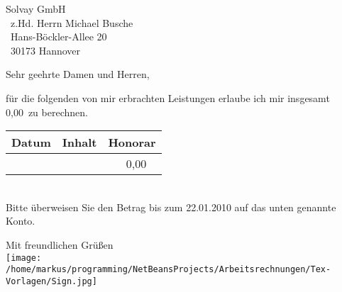 \documentclass[a4paper,12pt]{scrlttr2}
\begin{document}
\begin{letter}{Solvay GmbH\\\
z.Hd. Herrn Michael Busche\\\
Hans-Böckler-Allee 20\\\
30173 Hannover}
\opening{Sehr geehrte Damen und Herren,}
für die folgenden von mir erbrachten Leistungen erlaube ich mir insgesamt 0,00\officialeuro\ 
 zu berechnen.

\begin{tabular}{|l|l|r|}\hline 
Datum & Inhalt & Honorar\\\hline \hline 
\hline & & 0,00 \officialeuro\ \\\hline 
\end{tabular}\\


Bitte überweisen Sie den Betrag bis zum 22.01.2010
 auf das unten genannte Konto.
\closing{Mit freundlichen Grüßen\\\texttt{[image: /home/markus/programming/NetBeansProjects/Arbeitsrechnungen/Tex-Vorlagen/Sign.jpg]}}


\end{letter}
\end{document}
